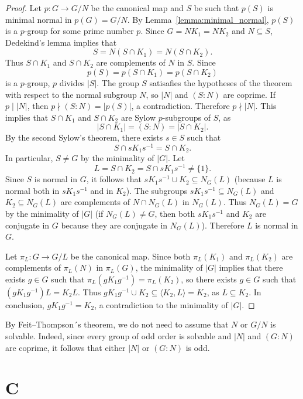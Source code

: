 \begin{proof}
	\medskip
	Let $p\colon G\to G/N$ be the canonical map and $S$ be such that $p(S)$
	is minimal normal in $p(G)=G/N$.  By Lemma~\ref{lemma:minimal_normal},
	$p(S)$ is a $p$-group for some prime number $p$.  Since $G=NK_1=NK_2$ and $N\subseteq
	S$, Dedekind's lemma implies that  
	\[
	S=N(S\cap K_1)=N(S\cap K_2).
	\]
	Thus $S\cap K_1$ and $S\cap K_2$
	are complements of $N$ in $S$. Since 
	\[
	p(S)=p(S\cap K_1)=p(S\cap K_2)
	\]
	is a $p$-group,
	$p$ divides $|S|$. The group $S$ 
	satisafies the hypotheses of the theorem 
	with respect to the normal subgroup $N$,
	so $|N|$ and $(S:N)$ are coprime. If $p\mid |N|$, then  
	$p\nmid (S:N)=|p(S)|$, a contradiction. Therefore $p\nmid |N|$. 
	This implies that $S\cap K_1$ and $S\cap K_2$ are
	Sylow $p$-subgroups of $S$, as 
	\[
		|S\cap K_1|=(S:N)=|S\cap K_2|.
	\]
	By the second Sylow's theorem, there exists $s\in
	S$ such that 
	\[
	S\cap sK_1s^{-1}=S\cap K_2.
	\]
	In particular, $S\ne G$ by the minimality of $|G|$.
	Let  
	\[
		L=S\cap K_2=S\cap sK_1s^{-1}\ne\{1\}.
	\]
	Since $S$ is normal in $G$, it follows that $sK_1s^{-1}\cup K_2\subseteq N_G(L)$ (because $L$
	is normal both in $sK_1s^{-1}$ and in $K_2$). The subgroups $sK_1s^{-1}\subseteq
	N_G(L)$ and $K_2\subseteq N_G(L)$ are complements of $N\cap N_G(L)$ in $N_G(L)$. Thus 
	$N_G(L)=G$ by the minimality of $|G|$ (if $N_G(L)\ne G$, then both 
	$sK_1s^{-1}$ and $K_2$ are conjugate in $G$ because they are conjugate in $N_G(L)$). Therefore 
	$L$ is normal in $G$. 
	
	Let $\pi_L\colon G\to G/L$ be the canonical map. Since both 
	$\pi_L(K_1)$ and $\pi_L(K_2)$ are complements of $\pi_L(N)$ in $\pi_L(G)$, the minimality 
	of $|G|$ implies that there exists $g\in G$ such that $\pi_L(gK_1g^{-1})=\pi_L(K_2)$, so  
	there exists $g\in G$ such that $(gK_1g^{-1})L=K_2L$.  Thus $gK_1g^{-1}\cup
	K_2\subseteq \langle K_2,L\rangle=K_2$, as $L\subseteq K_2$. In conclusion,	
	$gK_1g^{-1}=K_2$, a contradiction to the minimality of $|G|$. 
\end{proof}

By Feit--Thompson´s theorem, we do not need to assume that
$N$ or $G/N$ is solvable. Indeed, since every group of odd order is solvable and
$|N|$ and $(G:N)$ are coprime, it follows that either $|N|$ or $(G:N)$ is odd. 

\section*{C}
%

